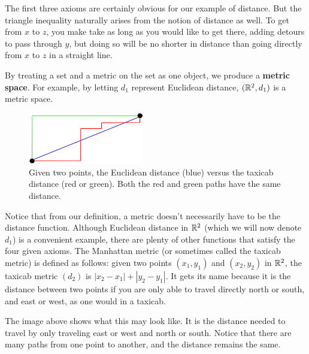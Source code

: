 The first three axioms are certainly obvious for our example of distance. But the triangle inequality naturally arises from the notion of distance as well. To get from $x$ to $z$, you make take as long as you would like to get there, adding detours to pass through $y$, but doing so will be no shorter in distance than going directly from $x$ to $z$ in a straight line. \par

\begin{definition}
    By treating a set and a metric on the set as one object, we produce a \textbf{metric space}. For example, by letting $d_1$ represent Euclidean distance, $(\mathbb{R}^2,d_1)$ is a metric space.
\end{definition}
\vspace{3mm}


\begin{figure}
  \begin{center}
    \includegraphics[width=0.45\textwidth]{Images/Chap0/metrics.png}
  \end{center}
  \caption{Given two points, the Euclidean distance (blue) versus the taxicab distance (red or green). Both the red and green paths have the same distance.}
\end{figure}

Notice that from our definition, a metric doesn't necessarily have to be the distance function. Although Euclidean distance in $\mathbb{R}^2$ (which we will now denote $d_1$) is a convenient example, there are plenty of other functions that satisfy the four given axioms. The Manhattan metric (or sometimes called the taxicab metric) is defined as follows: given two points $(x_1,y_1)$ and $(x_2,y_2)$ in $\mathbb{R}^2$, the taxicab metric $(d_2)$ is $|x_2-x_1|+|y_2-y_1|$. It gets its name because it is the distance between two points if you are only able to travel directly north or south, and east or west, as one would in a taxicab. \par

The image above shows what this may look like. It is the distance needed to travel by only traveling east or west and north or south. Notice that there are many paths from one point to another, and the distance remains the same. \par

